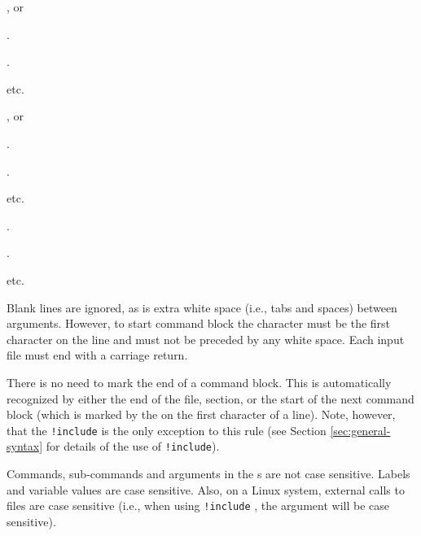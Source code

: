 \begin{multicols}{3}
	\begin{description}
		\item {}, or
		\item {} 
		\item {} 
		\item .
		\item .
		\item etc.
		\item {} , or
		\item {} 
		\item {} 
		\item .
		\item .
		\item etc.
		\item {} 
		\item {} 
		\item {} 
		\item .
		\item .
		\item etc.
		\end{description}
	\end{multicols}

Blank lines are ignored, as is extra white space (i.e., tabs and spaces) between arguments. However, to start command block the \command{} character must be the first character on the line and must not be preceded by any white space. Each input file must end with a carriage return.

There is no need to mark the end of a command block. This is automatically recognized by either the end of the file, section, or the start of the next command block (which is marked by the \command{} on the first character of a line). Note, however, that the \texttt{!include} is the only exception to this rule (see Section \ref{sec:general-syntax} for details of the use of \texttt{!include}).

Commands, sub-commands and arguments in the \config s are not case sensitive. Labels and variable values are case sensitive. Also, on a Linux system, external calls to files are case sensitive (i.e., when using \texttt{!include} , the argument  will be case sensitive).


